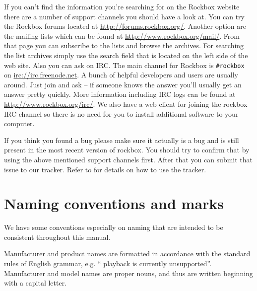 If you can't find the information you're searching for on the Rockbox
website there are a number of support channels you should have a look at.
You can try the Rockbox forums located at \url{http://forums.rockbox.org/}.
Another option are the mailing lists which can be found at
\url{http://www.rockbox.org/mail/}. From that page you can subscribe to the
lists and browse the archives. For searching the list archives simply use
the search field that is located on the left side of the web site.
Also you can ask on IRC. The main channel for Rockbox is \texttt{\#rockbox}
on \url{irc://irc.freenode.net}. A bunch of helpful developers and users
are usually around. Just join and ask -- if someone knows the answer you'll
usually get an answer pretty quickly. More information including IRC logs
can be found at \url{http://www.rockbox.org/irc/}. We also have a web client
for joining the rockbox IRC channel so there is no need for you
to install additional software to your computer.

If you think you found a bug please make sure it actually is a bug and is
still present in the most recent version of rockbox. You should try to
confirm that by using the above mentioned support channels first. After that
you can submit that issue to our tracker. Refer to 
for details on how to use the tracker.


\section{Naming conventions and marks}
We have some conventions especially on naming that are intended to be
consistent throughout this manual.

Manufacturer and product names are formatted in accordance with the standard
rules of English grammar, e.g. ``\playerman{} playback is currently
unsupported''. Manufacturer and model names are proper nouns, and
thus are written beginning with a capital letter.


